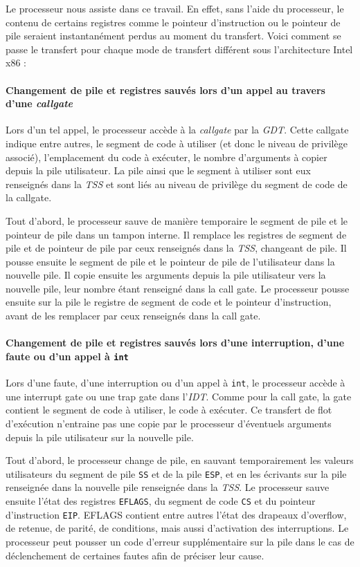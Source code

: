 Le processeur nous assiste dans ce travail. En effet, sans l'aide du processeur, le contenu de certains registres comme le pointeur d'instruction ou le pointeur de pile seraient instantanément perdus au moment du transfert. Voici comment se passe le transfert pour chaque mode de transfert différent sous l'architecture Intel x86 : 


\paragraph{Changement de pile et registres sauvés lors d'un appel au travers d'une \emph{callgate}}
\label{sec:intel_callgate}

Lors d'un tel appel, le processeur accède à la \emph{callgate} par la \emph{GDT}. Cette callgate indique entre autres, le segment de code à utiliser (et donc le niveau de privilège associé), l'emplacement du code à exécuter, le nombre d'arguments à copier depuis la pile utilisateur. La pile ainsi que le segment à utiliser sont eux renseignés dans la \emph{TSS} et sont liés au niveau de privilège du segment de code de la callgate.

Tout d'abord, le processeur sauve de manière temporaire le segment de pile et le pointeur de pile dans un tampon interne. Il remplace les registres de segment de pile et de pointeur de pile par ceux renseignés dans la \emph{TSS}, changeant de pile. Il pousse ensuite le segment de pile et le pointeur de pile de l'utilisateur dans la nouvelle pile. Il copie ensuite les arguments depuis la pile utilisateur vers la nouvelle pile, leur nombre étant renseigné dans la call gate. Le processeur pousse ensuite sur la pile le registre de segment de code et le pointeur d'instruction, avant de les remplacer par ceux renseignés dans la call gate.

\paragraph{Changement de pile et registres sauvés lors d'une interruption, d'une faute ou d'un appel à \texttt{int}}
\label{intel_hard_context}
Lors d'une faute, d'une interruption ou d'un appel à \texttt{int}, le processeur accède à une interrupt gate ou une trap gate dans l'\emph{IDT}. Comme pour la call gate, la gate contient le segment de code à utiliser, le code à exécuter. Ce transfert de flot d'exécution n'entraine pas une copie par le processeur d'éventuels arguments depuis la pile utilisateur sur la nouvelle pile.

Tout d'abord, le processeur change de pile, en sauvant temporairement les valeurs utilisateurs du segment de pile \texttt{SS} et de la pile \texttt{ESP}, et en les écrivants sur la pile renseignée dans la nouvelle pile renseignée dans la \emph{TSS}. Le processeur sauve ensuite l'état des registres \texttt{EFLAGS}, du segment de code \texttt{CS} et du pointeur d'instruction \texttt{EIP}. EFLAGS contient entre autres l'état des drapeaux d'overflow, de retenue, de parité, de conditions, mais aussi d'activation des interruptions. Le processeur peut pousser un code d'erreur supplémentaire sur la pile dans le cas de déclenchement de certaines fautes afin de préciser leur cause.

